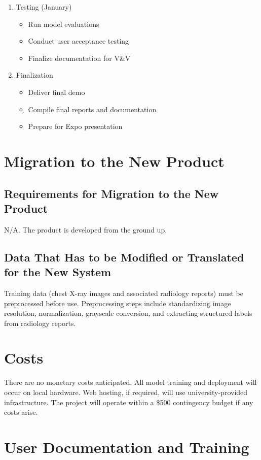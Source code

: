 \documentclass[12pt]{article}
\begin{document}
\begin{enumerate}
{    }
    \item {
        Testing (January)
        \begin{itemize}
            \item Run model evaluations
            \item Conduct user acceptance testing
            \item Finalize documentation for V\&V
        \end{itemize}
    }
    \item {
        Finalization
        \begin{itemize}
            \item Deliver final demo
            \item Compile final reports and documentation
            \item Prepare for Expo presentation
        \end{itemize}
    }
\end{enumerate}

\section{Migration to the New Product}

\subsection{Requirements for Migration to the New Product}
N/A. The product is developed from the ground up.

\subsection{Data That Has to be Modified or Translated for the New System}
Training data (chest X-ray images and associated radiology reports) must be preprocessed before use. Preprocessing steps include standardizing image resolution, normalization, grayscale conversion, and extracting structured labels from radiology reports.

\section{Costs}
There are no monetary costs anticipated. All model training and deployment will occur on local hardware. Web hosting, if required, will use university-provided infrastructure. The project will operate within a \$500 contingency budget if any costs arise.

\section{User Documentation and Training}
\end{document}
